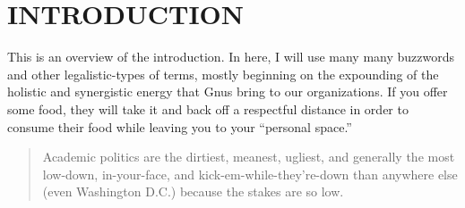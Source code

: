 %
%
%
%
%
%
%
%
%
%


%
%

\chapter{INTRODUCTION}

This is an overview of the introduction.  In here, I will use many
many buzzwords and other legalistic-types of terms, mostly beginning on
the expounding of the holistic and synergistic energy that Gnus bring
to our organizations. If you offer some food, they will take it and back off a
respectful distance in order to consume their food while leaving you
to your ``personal space.''  

\begin{quote}
  Academic politics are the dirtiest, meanest, ugliest, and generally
  the most low-down, in-your-face, and kick-em-while-they're-down than
  anywhere else (even Washington D.C.)  because the stakes are so low.
\end{quote}


%
% 
% 
